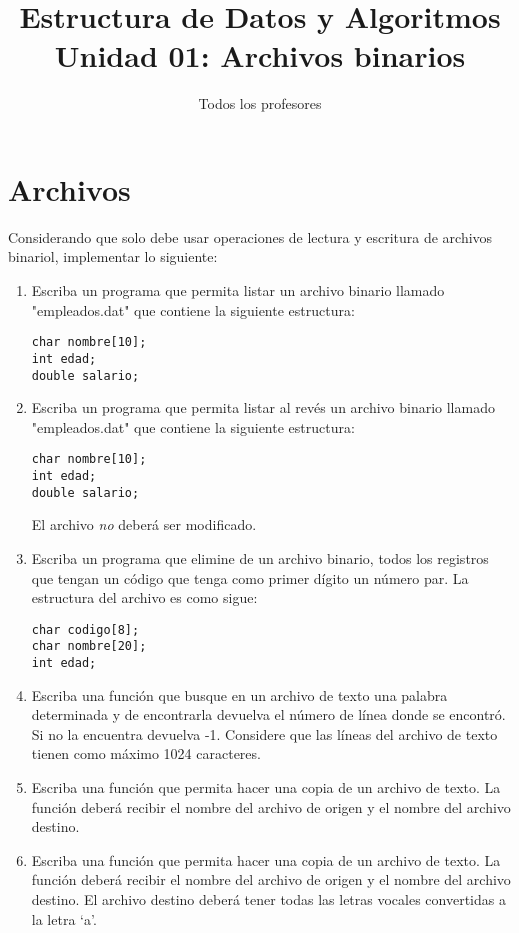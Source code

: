 \documentclass{article}
\title{Estructura de Datos y Algoritmos \\
  \large Unidad 01: Archivos binarios}
\author{Todos los profesores}
\date{}
\begin{document}
\maketitle

\section{Archivos}
Considerando que solo debe usar operaciones de lectura y escritura de archivos binariol, implementar lo siguiente:
\begin{enumerate}
  \item Escriba un programa que permita listar un archivo binario llamado 
        "empleados.dat" que contiene la siguiente estructura:

\begin{lstlisting}
char nombre[10];
int edad;
double salario;
\end{lstlisting}

  \item Escriba un programa que permita listar al revés un archivo binario
        llamado "empleados.dat" que contiene la siguiente estructura:

\begin{lstlisting}
char nombre[10];
int edad;
double salario;
\end{lstlisting}

	El archivo \emph{no} deberá ser modificado.
  \item Escriba un programa que elimine de un archivo binario, todos los
        registros que tengan un código que tenga como primer dígito un
        número par. La estructura del archivo es como sigue:

\begin{lstlisting}
char codigo[8];
char nombre[20];
int edad;
\end{lstlisting}

  \item Escriba una función que busque en un archivo de texto una palabra
        determinada y de encontrarla devuelva el número de línea donde se
        encontró. Si no la encuentra devuelva -1. Considere que las líneas
        del archivo de texto tienen como máximo 1024 caracteres.

  \item Escriba una función que permita hacer una copia de un archivo de texto.
        La función deberá recibir el nombre del archivo de origen y el nombre
        del archivo destino.

  \item Escriba una función que permita hacer una copia de un archivo de
        texto. La función deberá recibir el nombre del archivo de origen y
        el nombre del archivo destino. El archivo destino deberá tener todas
        las letras vocales convertidas a la letra ‘a’.


\end{enumerate}
\end{document}
